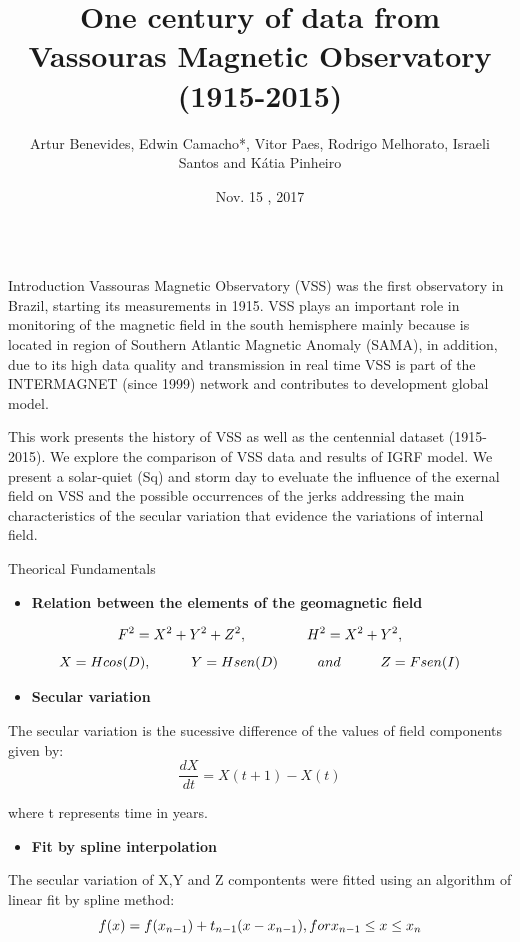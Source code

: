 \documentclass[final,t]{beamer}
\title{\huge One century of data from Vassouras Magnetic Observatory (1915-2015)}
\author[Benevides et. al.]{Artur Benevides, Edwin Camacho*, Vitor Paes, Rodrigo Melhorato, Israeli Santos and Kátia Pinheiro}
\institute[ON-MCTIC]{Observatório Nacional- ON/MCTIC}
\date[Nov , 2017]{Nov. 15 , 2017}
\begin{document}
  \begin{columns}[t]
    \begin{column}{.47\linewidth}
\begin{block}{Introduction}
\justifying	
 Vassouras Magnetic Observatory (VSS) was the first observatory in Brazil, starting its measurements in 1915. VSS plays an important role in monitoring of the magnetic field in the south hemisphere mainly because is located in region of Southern Atlantic Magnetic Anomaly (SAMA), in addition, due to its high data quality and transmission in real time VSS is part of the INTERMAGNET (since 1999) network and contributes to development global model.
 
 This work presents the history of VSS as well as the centennial dataset (1915-2015). We	explore the comparison of VSS data and results of IGRF model. We present a solar-quiet (Sq) and storm day to eveluate the influence of the exernal field on VSS and the possible occurrences of the jerks addressing the main characteristics of the secular variation that evidence the variations of internal field.	

\end{block}		

	
	\begin{block}{Theorical Fundamentals}
		
		
		\begin{itemize}
			\item \textbf{Relation between the elements of the geomagnetic field}
		\end{itemize}	
		\[ F^{2} = X^{2} + Y^{2} + Z^{2}, \hspace{1.5cm} H^{2} = X^{2} + Y^{2}, \]
		\[	   X = Hcos(D), \hspace{1.0cm} Y = Hsen(D) \hspace{1.0cm} and \hspace{1.0cm} Z = Fsen(I)\]
	
		
		
		\begin{itemize}	
			\item \textbf{Secular variation}
		\end{itemize}
		The secular variation is the sucessive difference of the values of field components given by:
		\[\frac{dX}{dt} = X(t+1)-X(t)\]
		
		where t represents time in years.
		
		\begin{itemize}
			\item \textbf{Fit by spline interpolation}
		\end{itemize}
		The secular variation of X,Y and Z compontents were fitted using an algorithm  of linear fit by spline method: 
		\[ f(x)= f(x_{n-1})+t_{n-1}(x-x_{n-1}), \\
		for x_{n-1} \le x \le x_{n} \]\\
		

\end{block}
\end{column}
\end{columns}
\end{document}
